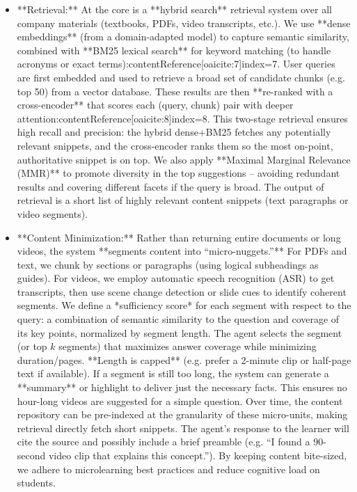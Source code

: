 \documentclass[11pt]{article}
\begin{document}
\begin{itemize}
  \item **Retrieval:** At the core is a **hybrid search** retrieval system over all company materials (textbooks, PDFs, video transcripts, etc.). We use **dense embeddings** (from a domain-adapted model) to capture semantic similarity, combined with **BM25 lexical search** for keyword matching (to handle acronyms or exact terms):contentReference[oaicite:7]{index=7}. User queries are first embedded and used to retrieve a broad set of candidate chunks (e.g. top 50) from a vector database. These results are then **re-ranked with a cross-encoder** that scores each (query, chunk) pair with deeper attention:contentReference[oaicite:8]{index=8}. This two-stage retrieval ensures high recall and precision: the hybrid dense+BM25 fetches any potentially relevant snippets, and the cross-encoder ranks them so the most on-point, authoritative snippet is on top. We also apply **Maximal Marginal Relevance (MMR)** to promote diversity in the top suggestions – avoiding redundant results and covering different facets if the query is broad. The output of retrieval is a short list of highly relevant content snippets (text paragraphs or video segments).
  \item **Content Minimization:** Rather than returning entire documents or long videos, the system **segments content into “micro-nuggets.”** For PDFs and text, we chunk by sections or paragraphs (using logical subheadings as guides). For videos, we employ automatic speech recognition (ASR) to get transcripts, then use scene change detection or slide cues to identify coherent segments. We define a *sufficiency score* for each segment with respect to the query: a combination of semantic similarity to the question and coverage of its key points, normalized by segment length. The agent selects the segment (or top $k$ segments) that maximizes answer coverage while minimizing duration/pages. **Length is capped** (e.g. prefer a 2-minute clip or half-page text if available). If a segment is still too long, the system can generate a **summary** or highlight to deliver just the necessary facts. This ensures no hour-long videos are suggested for a simple question. Over time, the content repository can be pre-indexed at the granularity of these micro-units, making retrieval directly fetch short snippets. The agent’s response to the learner will cite the source and possibly include a brief preamble (e.g. “I found a 90-second video clip that explains this concept.”). By keeping content bite-sized, we adhere to microlearning best practices and reduce cognitive load on students.

\end{itemize}
\end{document}
